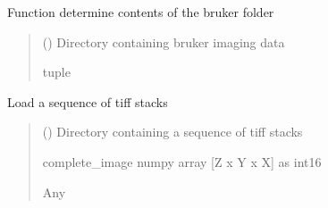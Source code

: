 \documentclass[letterpaper,10pt,english]{sphinxmanual}
\begin{document}
\begin{fulllineitems}
\label{\detokenize{IO:IO.determine_bruker_folder_contents}}
\pysigstartsignatures
{}
\pysigstopsignatures
\sphinxAtStartPar
Function determine contents of the bruker folder
\begin{quote}\begin{description}
\sphinxAtStartPar
{} () \textendash{} Directory containing bruker imaging data

\sphinxAtStartPar
tuple

\end{description}\end{quote}

\end{fulllineitems}


\begin{fulllineitems}
\label{\detokenize{IO:IO.load_all_tiffs}}
\pysigstartsignatures
{}
\pysigstopsignatures
\sphinxAtStartPar
Load a sequence of tiff stacks
\begin{quote}\begin{description}
\sphinxAtStartPar
{} () \textendash{} Directory containing a sequence of tiff stacks

\sphinxAtStartPar
complete\_image numpy array {[}Z x Y x X{]} as int16

\sphinxAtStartPar
Any

\end{description}\end{quote}

\end{fulllineitems}
\end{document}
